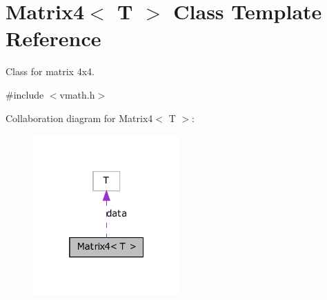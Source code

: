\hypertarget{class_matrix4}{
\section{Matrix4$<$ T $>$ Class Template Reference}
\label{class_matrix4}
}


Class for matrix 4x4.  




{\ttfamily \#include $<$vmath.h$>$}



Collaboration diagram for Matrix4$<$ T $>$:
\nopagebreak
\begin{figure}[H]
\begin{center}
\leavevmode
\includegraphics[width=160pt]{class_matrix4__coll__graph}
\end{center}
\end{figure}
